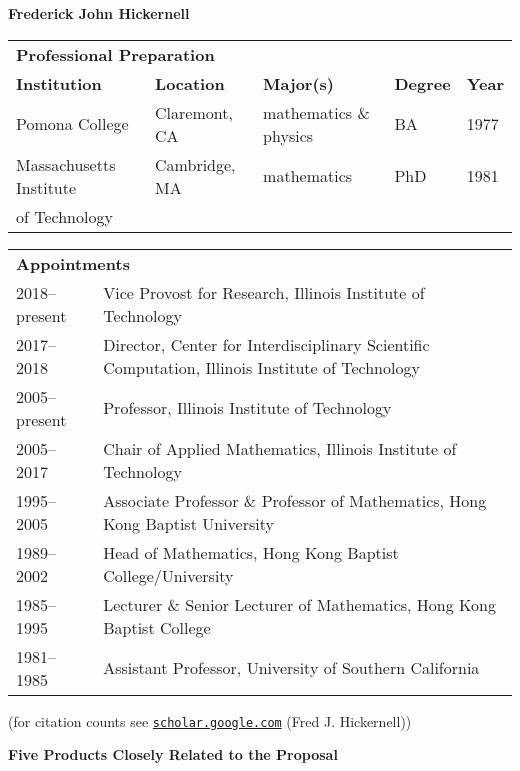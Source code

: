 \documentclass[11 pt]{NSFamsart}
\begin{document}
\centerline{\Large \bf Frederick John Hickernell}

\medskip

\noindent
\begin{tabular}{lllll}
	\multicolumn{5}{l}{{\large\textbf{Professional Preparation}}} \\
	\textbf{Institution} & \textbf{Location} & \textbf{Major(s)} & \textbf{Degree} & \textbf{Year} \\
	Pomona College & Claremont, CA & mathematics \& physics & BA & 1977 \\
	Massachusetts Institute  & Cambridge, MA &  mathematics  &  PhD &1981 \\
	\hspace{3cm} of Technology
\end{tabular}

\bigskip

\noindent
\begin{tabular}{lp{13.5cm}}
	\multicolumn{2}{l}{{\large\textbf{Appointments}}} \\
	2018--present & Vice Provost for Research, Illinois Institute of Technology \\
2017--2018 & Director, Center for Interdisciplinary Scientific Computation, Illinois Institute of 
Technology \\ 
2005--present & Professor, Illinois Institute of Technology \\ 
2005--2017 & Chair of Applied Mathematics, Illinois Institute of Technology \\ 
1995--2005  &  Associate Professor \& Professor of Mathematics, Hong Kong Baptist
University\\ 
1989--2002 & Head of Mathematics, Hong Kong Baptist College/University \\ 
1985--1995 &  Lecturer \& Senior Lecturer of Mathematics, Hong Kong Baptist College \\
1981--1985 & Assistant Professor, University of Southern California
\end{tabular}

\bigskip

 (for citation counts see 
\href{http://scholar.google.com/citations?user=dJbMJG8AAAAJ}{\nolinkurl{scholar.google.com}} 
(Fred J. Hickernell))

\bigskip 

\centerline{\textbf{Five Products Closely Related to the Proposal}}
\end{document}
